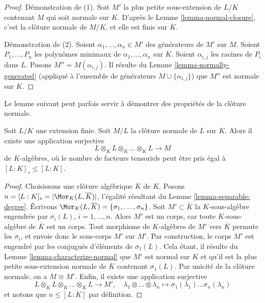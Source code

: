 \begin{proof}
Démonstration de (1). Soit $M'$ la plus petite sous-extension de $L/K$ contenant $M$
qui soit normale sur $K$. D'après le Lemme \ref{lemma-normal-closure},
c'est la clôture normale de $M/K$, et elle est finie sur $K$.

\medskip\noindent
Démonstration de (2). Soient $\alpha_1, \ldots, \alpha_n \in M'$ des générateurs de $M'$ sur $M$.
Soient $P_1, \ldots, P_n$ les polynômes minimaux de
$\alpha_1, \ldots, \alpha_n$ sur $K$. Soient $\alpha_{i, j}$ les racines
de $P_i$ dans $L$. Posons $M''  = M(\alpha_{i, j})$. Il résulte du
Lemme \ref{lemma-normally-generated}
(appliqué à l'ensemble de générateurs $M \cup \{\alpha_{i, j}\}$)
que $M''$ est normale sur $K$.
\end{proof}

\noindent
Le lemme suivant peut parfois servir à démontrer des propriétés
de la clôture normale.

\begin{lemma}
\label{lemma-normal-closure-tensor-product}
Soit $L/K$ une extension finie. Soit $M/L$ la clôture
normale de $L$ sur $K$. Alors il existe une application surjective
$$
L \otimes_K L \otimes_K \ldots \otimes_K L \longrightarrow M
$$
de $K$-algèbres, où le nombre de facteurs tensoriels peut être pris égal à
$[L : K]_s \leq [L : K]$.
\end{lemma}

\begin{proof}
Choisissons une clôture algébrique $\overline{K}$ de $K$.
Posons $n = [L : K]_s = |\Mor_K(L, \overline{K})|$, l'égalité résultant du
Lemme \ref{lemma-separable-degree}.
Écrivons $\Mor_K(L, \overline{K}) = \{\sigma_1, \ldots, \sigma_n\}$.
Soit $M' \subset \overline{K}$ la $K$-sous-algèbre
engendrée par $\sigma_i(L)$, $i = 1, \ldots, n$. Alors $M'$ est
un corps, car toute $K$-sous-algèbre de $\overline{K}$ est un corps.
Tout morphisme de $K$-algèbres de $M'$ vers $\overline{K}$ permute les $\sigma_i$,
et envoie donc le sous-corps $M'$ sur $M'$. Par construction, le corps $M'$
est engendré par les conjugués d'éléments de $\sigma_1(L)$. Cela étant,
il résulte du Lemme \ref{lemma-characterize-normal}
que $M'$ est normal sur $K$ et qu'il est la
plus petite sous-extension normale de $\overline{K}$ contenant
$\sigma_1(L)$. Par unicité de la clôture normale, on a $M \cong M'$.
Enfin, il existe une application surjective
$$
L \otimes_K L \otimes_K \ldots \otimes_K L \longrightarrow M',
\quad
\lambda_1 \otimes \ldots \otimes \lambda_n \longmapsto
\sigma_1(\lambda_1) \ldots \sigma_n(\lambda_n)
$$
et notons que $n \leq [L : K]$ par définition.
\end{proof}












